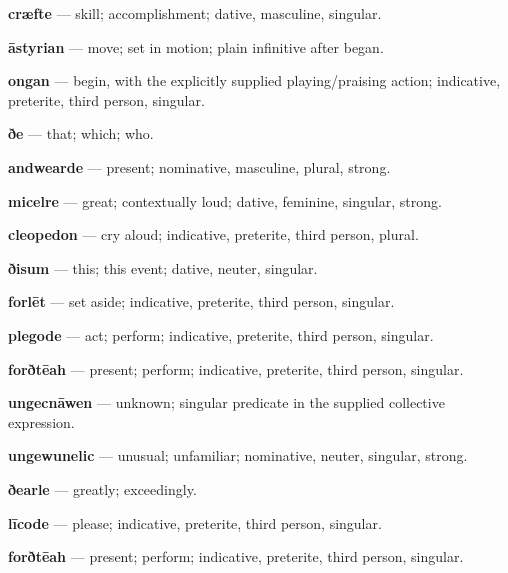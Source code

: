 \textbf{cræfte} — skill; accomplishment; dative, masculine, singular.

\textbf{āstyrian} — move; set in motion; plain infinitive after began.

\textbf{ongan} — begin, with the explicitly supplied playing/\allowbreak{}praising action; indicative, preterite, third person, singular.

\textbf{ðe} — that; which; who.

\textbf{andwearde} — present; nominative, masculine, plural, strong.

\textbf{micelre} — great; contextually loud; dative, feminine, singular, strong.

\textbf{cleopedon} — cry aloud; indicative, preterite, third person, plural.

\textbf{ðisum} — this; this event; dative, neuter, singular.

\textbf{forlēt} — set aside; indicative, preterite, third person, singular.

\textbf{plegode} — act; perform; indicative, preterite, third person, singular.

\textbf{forðtēah} — present; perform; indicative, preterite, third person, singular.

\textbf{ungecnāwen} — unknown; singular predicate in the supplied collective expression.

\textbf{ungewunelic} — unusual; unfamiliar; nominative, neuter, singular, strong.

\textbf{ðearle} — greatly; exceedingly.

\textbf{līcode} — please; indicative, preterite, third person, singular.

\textbf{forðtēah} — present; perform; indicative, preterite, third person, singular.

